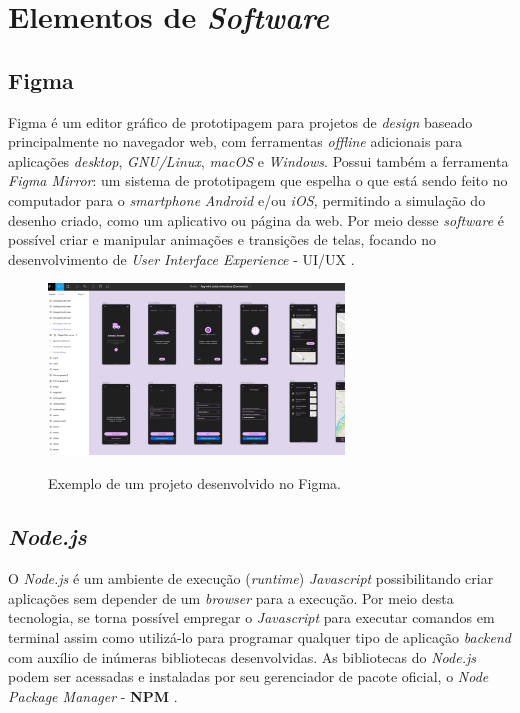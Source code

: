 \section{Elementos de \textit{Software}}

\subsection{Figma}

Figma é um editor gráfico de prototipagem para projetos de \textit{design} baseado principalmente no navegador web, com ferramentas \textit{offline} adicionais para aplicações \textit{desktop}, \textit{GNU/Linux}, \textit{macOS} e \textit{Windows}. Possui também a ferramenta \textit{Figma Mirror}: um sistema de prototipagem que espelha o que está sendo feito no computador para o \textit{smartphone} \textit{Android} e/ou \textit{iOS,} permitindo a simulação do desenho criado, como um aplicativo ou página da web. Por meio desse \textit{software} é possível criar e manipular animações e transições de telas, focando no desenvolvimento de \textit{User Interface Experience} - UI/UX \cite{Figma}.

\begin{figure}[H]
	\centering
	\caption{Exemplo de um projeto desenvolvido no Figma.}
	\includegraphics[width=0.7\textwidth]{figuras/figma_exemplo.jpg}
	\label{fig:figma_exemplo}
\end{figure} 



\subsection{\textit{Node.js}}

O \textit{Node.js} é um ambiente de execução (\textit{runtime}) \textit{Javascript} possibilitando criar aplicações sem depender de um \textit{browser} para a execução. Por meio desta tecnologia, se torna possível empregar o \textit{Javascript} para executar comandos em terminal assim como utilizá-lo para programar qualquer tipo de aplicação \textit{backend} com auxílio de inúmeras bibliotecas desenvolvidas. As bibliotecas do \textit{Node.js} podem ser acessadas e instaladas por seu gerenciador de pacote oficial, o \textit{Node Package Manager} - \textbf{NPM} \cite{NodeJs}.


